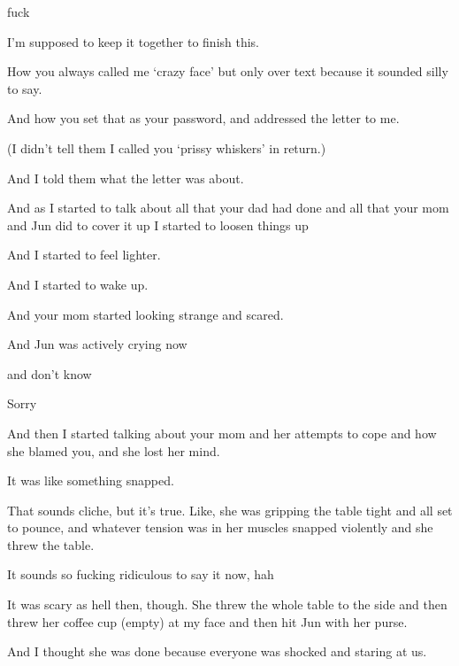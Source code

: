 { fuck

 I'm supposed to keep it together to finish this.

 How you always called me `crazy face' but only over text because it sounded silly to say.

 And how you set that as your password, and addressed the letter to me.

(I didn't tell them I called you `prissy whiskers' in return.)

 And I told them what the letter was about.

 And as I started to talk about all that your dad had done and all that your mom and Jun did to cover it up I started to loosen things up

 And I started to feel lighter.

 And I started to wake up.

 And your mom started looking strange and scared.

 And Jun was actively crying now

 and don't know

\nopagebreak

 Sorry

 And then I started talking about your mom and her attempts to cope and how she blamed you, and she lost her mind.

 It was like something snapped.

 That sounds cliche, but it's true. Like, she was gripping the table tight and all set to pounce, and whatever tension was in her muscles snapped violently and she threw the table.

 It sounds so fucking ridiculous to say it now, hah

 It was scary as hell then, though. She threw the whole table to the side and then threw her coffee cup (empty) at my face and then hit Jun with her purse.

 And I thought she was done because everyone was shocked and staring at us.

}
